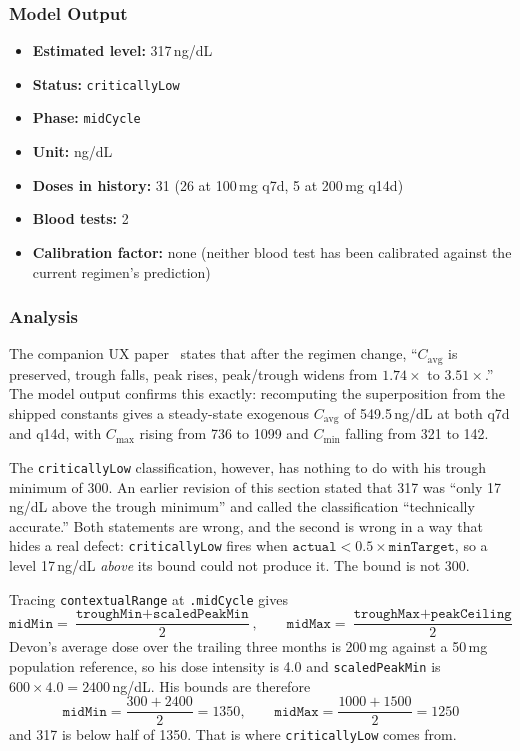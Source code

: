 \documentclass[11pt,a4paper]{article}
\newcommand{\code}[1]{\texttt{\small #1}}
\begin{document}
\subsubsection{Model Output}

\begin{itemize}[nosep,leftmargin=1.4em]
\item \textbf{Estimated level:} 317\,ng/dL
\item \textbf{Status:} \code{criticallyLow}
\item \textbf{Phase:} \code{midCycle}
\item \textbf{Unit:} ng/dL
\item \textbf{Doses in history:} 31 (26 at 100\,mg q7d, 5 at 200\,mg q14d)
\item \textbf{Blood tests:} 2
\item \textbf{Calibration factor:} none (neither blood test has been
  calibrated against the current regimen's prediction)
\end{itemize}

\subsubsection{Analysis}

The companion UX paper~\cite{xtux} states that after the regimen change,
``$C_{\mathrm{avg}}$ is preserved, trough falls, peak rises, peak/trough
widens from $1.74\times$ to $3.51\times$.'' The model output confirms this
exactly: recomputing the superposition from the shipped constants gives a
steady-state exogenous $C_{\mathrm{avg}}$ of 549.5\,ng/dL at both q7d and
q14d, with $C_{\max}$ rising from 736 to 1099 and $C_{\min}$ falling from
321 to 142.

The \code{criticallyLow} classification, however, has nothing to do with his
trough minimum of 300. An earlier revision of this section stated that 317
was ``only 17\,ng/dL above the trough minimum'' and called the
classification ``technically accurate.'' Both statements are wrong, and
the second is wrong in a way that hides a real defect:
\code{criticallyLow} fires when
$\texttt{actual} < 0.5 \times \texttt{minTarget}$, so a level 17\,ng/dL
\emph{above} its bound could not produce it. The bound is not 300.

Tracing \code{contextualRange} at \code{.midCycle} gives
\[
\texttt{midMin} = \frac{\texttt{troughMin} + \texttt{scaledPeakMin}}{2},
\qquad
\texttt{midMax} = \frac{\texttt{troughMax} + \texttt{peakCeiling}}{2}
\]
Devon's average dose over the trailing three months is 200\,mg against a
50\,mg population reference, so his dose intensity is 4.0 and
\code{scaledPeakMin} is $600 \times 4.0 = 2400$\,ng/dL. His bounds are
therefore
\[
\texttt{midMin} = \frac{300 + 2400}{2} = 1350,
\qquad
\texttt{midMax} = \frac{1000 + 1500}{2} = 1250
\]
and 317 is below half of 1350. That is where \code{criticallyLow} comes
from.
\end{document}

